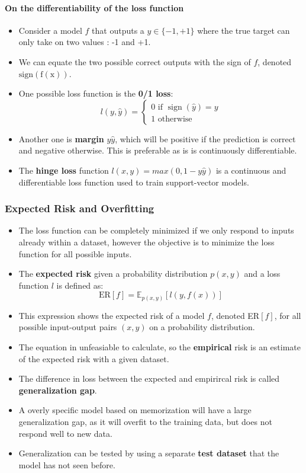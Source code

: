 \documentclass{article}
\newcommand{\tbf}[1]{\textbf{#1}}
\begin{document}
\paragraph{On the differentiability of the loss function}
\begin{itemize}
    \item Consider a model $f$ that outputs a $y \in \{-1,+1\}$ where the true target can only take on two values : -1 and +1.
    \item We can equate the two possible correct outputs with the sign of $f$, denoted $\operatorname{sign(f(x))}$.
    \item One possible loss function is the \tbf{0/1 loss}:
    \[
    l(y, \hat{y}) = 
    \begin{cases}
        0 \text{ if } \operatorname{sign}(\hat{y}) = y \\
        1 \text{ otherwise }
    \end{cases}
    \]
    \item Another one is \tbf{margin} $y \hat{y}$, which will be positive if the prediction is correct and negative otherwise. 
    This is preferable as is is continuously differentiable. 
    \item The \tbf{hinge loss} function $l(x,y) = max(0,1-y\hat{y})$ is a continuous and differentiable loss function used to train support-vector models.
\end{itemize}

\subsubsection{Expected Risk and Overfitting}

\begin{itemize}
    \item The loss function can be completely minimized if we only respond to inputs already within a dataset, 
    however the objective is to minimize the loss function for all possible inputs.
    \item The \tbf{expected risk} given a probability distribution $p(x,y)$ and a loss function $l$ is defined as:
    \[\text{ER}[f] = \mathbb{E}_{p(x,y)}[l(y,f(x))]\]
    \item This expression shows the expected risk of a model $f$, denoted ER$[f]$, for all possible input-output pairs $(x,y)$ on a probability distribution. 
    \item The equation in unfeasiable to calculate, so the \tbf{empirical} risk is an estimate of the expected risk with a given dataset.
    \item The difference in loss between the expected and empirircal risk is called \tbf{generalization gap}. 
    \item A overly specific model based on memorization will have a large generalization gap, as it will overfit to the training data, 
    but does not respond well to new data.
    \item Generalization can be tested by using a separate \tbf{test dataset} that the model has not seen before.
\end{itemize}
\end{document}
